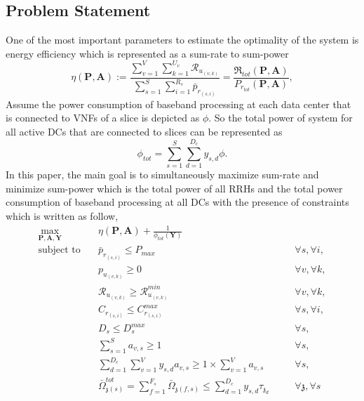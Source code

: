 \documentclass[conference]{IEEEtran}
\begin{document}
\subsection{Problem Statement}
One of the most important parameters to estimate the optimality of the system is energy efficiency which is represented as a sum-rate to sum-power 
\begin{equation}
\eta(\boldsymbol{P},\boldsymbol{A}) := \frac{\sum\limits_{v=1}^{V} \sum\limits_{k=1}^{{U}_v}\mathcal{R}_{u_{(v,k)}} }{\sum\limits_{s=1}^{S} \sum\limits_{i=1}^{{R}_s}\bar{p}_{r_{(s,i)}}} = \frac{\mathfrak{R}_{tot}(\boldsymbol{P},\boldsymbol{A})}{P_{r_{tot}}(\boldsymbol{P},\boldsymbol{A})},
\end{equation}
Assume the power consumption of baseband processing at each data center that is connected to VNFs of a slice is depicted as
$\phi$. So the total power of system for all active DCs that are connected to slices can be represented as  
\begin{equation*}
\phi_{tot} = \sum_{s=1}^{S}\sum_{d=1}^{D_c}y_{s,d}\phi.
\end{equation*} 
In this paper, the main goal is to simultaneously maximize sum-rate and minimize sum-power which is the total power of all RRHs and the total power consumption of baseband processing at all DCs with the presence of constraints which is written as follow, 
\begin{subequations}
\begin{alignat}{4}
\max\limits_{\boldsymbol{P}, \boldsymbol{A}, \boldsymbol{Y} }   \quad &   \eta(\boldsymbol{P},\boldsymbol{A})+\frac{1}{\phi_{tot}(\boldsymbol{Y})} \\
\text{subject to} \quad  & \bar{p}_{r_{(s,i)}} \leq P_{max} && \quad \forall s, \forall i, 
 \label{c11} \\
&p_{u_{(v,k)}}  \geq 0  &&\quad \forall v, \forall k,\label{c12} \\
&\mathcal{R}_{u_{(v,k)}} \geq  \mathcal{R}_{u_{(v,k)}}^{min} && \quad \forall v, \forall k,\label{c13} \\                                 
&C_{r_{(s,i)}} \leq C_{r_{(s,i)}}^{max}  &&\quad \forall s, \forall i, \label{c14}\\
&D_{s} \leq D_{s}^{max}  &&\quad \forall s,\label{c15} \\
& \sum_{s=1}^{S}a_{v,s} \geq 1 &&\quad \forall s, \label{c21} \\
& \sum_{d=1}^{D_c}\sum_{v=1}^{V}y_{s,d}a_{v,s} \geq 1\times\sum_{v=1}^{V}a_{v,s} &&\quad \forall s,\label{c23} \\
& \bar{\Omega}_{\mathfrak{z}(s)}^{tot} = \sum_{f=1}^{F_s}\bar{\Omega}_{\mathfrak{z}(f,s)} \leq  \sum_{d=1}^{D_c} y_{s,d} \tau_{\mathfrak{z}_d}                      
 && \quad \forall \mathfrak{z}, \forall s  \label{c22}
\end{alignat}
\label{constraints}
\end{subequations}
\end{document}
